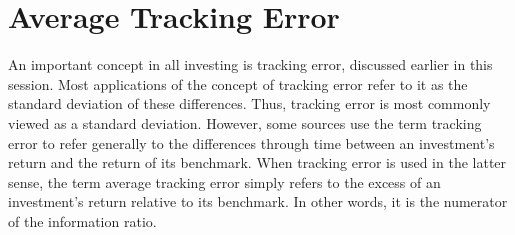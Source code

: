 \documentclass[11pt]{article}
\begin{document}
\section*{Average Tracking Error}
An important concept in all investing is tracking error, discussed earlier in this session. Most applications of the concept of tracking error refer to it as the standard deviation of these differences. Thus, tracking error is most commonly viewed as a standard deviation. However, some sources use the term tracking error to refer generally to the differences through time between an investment's return and the return of its benchmark. When tracking error is used in the latter sense, the term average tracking error simply refers to the excess of an investment's return relative to its benchmark. In other words, it is the numerator of the information ratio.
\end{document}
